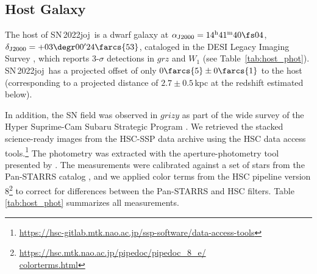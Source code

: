 \documentclass[twocolumn]{aastex631}
\newcommand{\sn}{SN\,2022joj}
\begin{document}
\begin{CJK*}{UTF8}{gbsn}
\subsection{Host Galaxy}\label{sec:host}
The host of \sn\ is a dwarf galaxy at $\alpha_\mathrm{J2000}=14^\mathrm{h}41^\mathrm{m}40\fs04$, $\delta_\mathrm{J2000}=+03\degr00'24\farcs{53}$, cataloged in the DESI Legacy Imaging Survey \citep[LS;][]{Dey_LS_2019}, which reports 3-$\sigma$ detections in $grz$ and $W_1$ (see Table~\ref{tab:host_phot}). \sn\ has a projected offset of only $0\farcs{5}\pm0\farcs{1}$ to the host (corresponding to a projected distance of $2.7\pm0.5$\,kpc at the redshift estimated below). 

In addition, the SN field was observed in $grizy$ as part of the wide survey of the Hyper Suprime-Cam Subaru Strategic Program \citep[HSC-SSP;][]{Aihara2018a}. We retrieved the stacked science-ready images from the HSC-SSP data archive using the HSC data access tools.\footnote{\href{https://hsc-gitlab.mtk.nao.ac.jp/ssp-software/data-access-tools}{https://hsc-gitlab.mtk.nao.ac.jp/ssp-software/data-access-tools}} The photometry was extracted with the aperture-photometry tool presented by \citet{Schulze2018a}. The measurements were calibrated against a set of stars from the Pan-STARRS catalog \citep{PS1_2016}, and we applied color terms from the HSC pipeline version 8\footnote{\href{https://hsc.mtk.nao.ac.jp/pipedoc/pipedoc_8_e/colorterms.html}{https://hsc.mtk.nao.ac.jp/pipedoc/pipedoc\_8\_e/\\colorterms.html}} to correct for differences between the Pan-STARRS and HSC filters. Table \ref{tab:host_phot} summarizes all measurements.


\end{CJK*}
\end{document}
